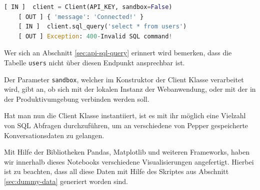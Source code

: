 \begin{lstlisting}[language=Python, caption={Instantiierung des Clients und Ausführen einer SQL - Abfrage }]
    [ IN ]  client = Client(API_KEY, sandbox=False)
    [ OUT ] { 'message': 'Connected!' }
    [ IN ]  client.sql_query('select * from users')
    [ OUT ] Exception: 400-Invalid SQL command!
\end{lstlisting}

Wer sich an Abschnitt \ref{sec:api-sql-query} erinnert wird bemerken, dass die Tabelle \verb|users| nicht über diesen Endpunkt ansprechbar ist.

Der Parameter \verb|sandbox|, welcher im Konstruktor der Client Klasse verarbeitet wird, gibt an, ob sich mit der lokalen Instanz der Webanwendung, oder mit der in der Produktivumgebung verbinden werden soll.

Hat man nun die Client Klasse instantiiert, ist es mit ihr möglich eine Vielzahl von SQL Abfragen durchzuführen, um an verschiedene von Pepper gespeicherte Konversationsdaten zu gelangen.

Mit Hilfe der Bibliotheken Pandas, Matplotlib und weiteren Frameworks, haben wir innerhalb dieses Notebooks verschiedene Visualisierungen angefertigt. Hierbei ist zu beachten, dass all diese Daten mit Hilfe des Skriptes aus Abschnitt \ref{sec:dummy-data} generiert worden sind.\\

